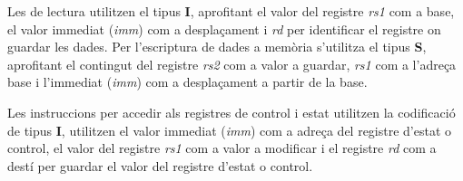 \documentclass[10pt,a4paper,twocolumn,twoside]{article}
\begin{document}
    Les de lectura utilitzen el tipus \textbf{I}, aprofitant el valor del registre \textit{rs1} com a base, el valor immediat (\textit{imm}) com a desplaçament i \textit{rd} per identificar el registre on guardar les dades.
    Per l'escriptura de dades a memòria s'utilitza el tipus \textbf{S}, aprofitant el contingut del registre \textit{rs2} com a valor a guardar, \textit{rs1} com a l'adreça base i l'immediat (\textit{imm}) com a desplaçament a partir de la base.
        
    Les instruccions per accedir als registres de control i estat utilitzen la codificació de tipus \textbf{I}, utilitzen el valor immediat (\textit{imm}) com a adreça del registre d'estat o control, el valor del registre \textit{rs1} com a valor a modificar i el registre \textit{rd} com a destí per guardar el valor del registre d'estat o control.
    
    
\end{document}
